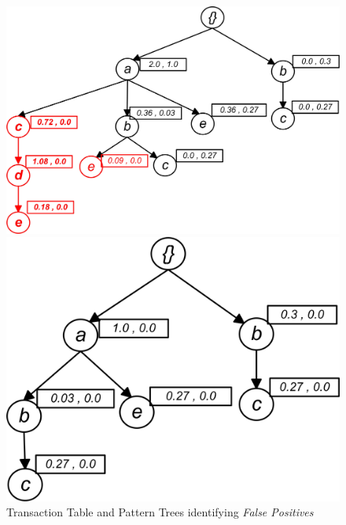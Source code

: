 %
%
%
% 
%
%

\begin{figure}
\begin{minipage}{0.50\textwidth}
  \centering
  \includegraphics[width=\textwidth]{images/sim_06_slide.jpg}
\end{minipage}
\hfill
\begin{minipage}{0.50\textwidth}
  \centering
  \includegraphics[width=\textwidth]{images/sim_06_slide_2.jpg}
\end{minipage}
\caption{Transaction Table and Pattern Trees identifying \emph{False Positives}}
\label{figure:frequent_patterns_final}
\end{figure}